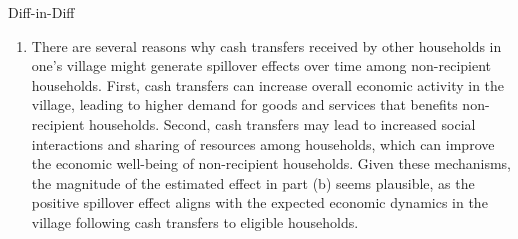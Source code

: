 \begin{homeworkProblem}{Diff-in-Diff}
\begin{solution}
\begin{enumerate}
\begin{enumerate}
                \item There are several reasons why cash transfers received by
                    other households in one's village might generate spillover
                    effects over time among non-recipient households. First,
                    cash transfers can increase overall economic activity in 
                    the village, leading to higher demand for goods and services that
                    benefits non-recipient households. Second, cash transfers may
                    lead to increased social interactions and sharing of resources
                    among households, which can improve the economic well-being of
                    non-recipient households. Given these mechanisms, the magnitude of the estimated effect
                    in part (b) seems plausible, as the positive spillover effect aligns with the expected
                    economic dynamics in the village following cash transfers
                    to eligible households.
            \end{enumerate}
        \end{enumerate}
    \end{solution}

\end{homeworkProblem}